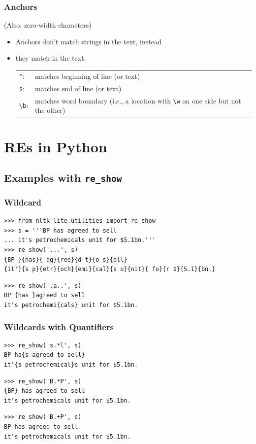 \begin{frame}[fragile]
  \frametitle{Anchors}

(Also: zero-width characters)

\begin{itemize}
  \item Anchors don't match strings in the text, instead
  \item they match  in the text.\\

 \begin{tabular}{lp{3in}}
\verb!^!: & matches beginning of line (or text)\\
\verb!$!: & matches end of line (or text) \\%
\verb!\b!: &  matches word boundary (i.e., a location with \verb!\w! on one side
but not the other)  \\
  \end{tabular}
\end{itemize}
 
\end{frame}

\section{REs in Python}

\subsection{Examples with \texttt{re\_show}}

\begin{frame}[fragile]
\frametitle{Wildcard}

\begin{verbatim}
>>> from nltk_lite.utilities import re_show
>>> s = '''BP has agreed to sell
... it's petrochemicals unit for $5.1bn.'''
>>> re_show('...', s)
{BP }{has}{ ag}{ree}{d t}{o s}{ell}
{it'}{s p}{etr}{och}{emi}{cal}{s u}{nit}{ fo}{r $}{5.1}{bn.}
\end{verbatim}
\begin{verbatim}
>>> re_show('.a..', s)
BP {has }agreed to sell
it's petrochemi{cals} unit for $5.1bn.
\end{verbatim}

\end{frame}



\begin{frame}[fragile]
\frametitle{Wildcards with Quantifiers}


\begin{verbatim}
>>> re_show('s.*l', s)
BP ha{s agreed to sell}
it'{s petrochemical}s unit for $5.1bn.
\end{verbatim}

\begin{verbatim}
>>> re_show('B.*P', s)
{BP} has agreed to sell
it's petrochemicals unit for $5.1bn.
\end{verbatim}

\begin{verbatim}
>>> re_show('B.+P', s)
BP has agreed to sell
it's petrochemicals unit for $5.1bn.
\end{verbatim}
\end{frame}

